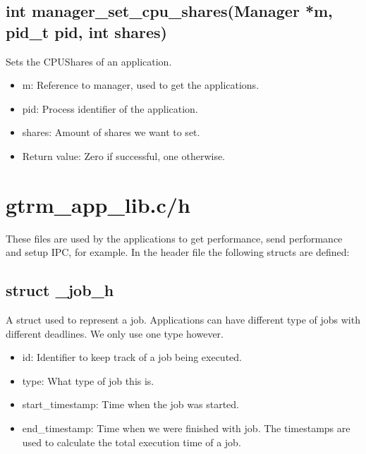 \documentclass[nobiblatex]{LTHthesis}
\begin{document}
\subsection{int manager\_set\_cpu\_shares(Manager *m, pid\_t pid, int shares)}
Sets the CPUShares of an application.
\begin{itemize}
\item m: Reference to manager, used to get the applications.
\item pid: Process identifier of the application.
\item shares: Amount of shares we want to set.
\item Return value: Zero if successful, one otherwise.
\end{itemize}

\section{gtrm\_app\_lib.c/h}
These files are used by the applications to get performance, send performance and setup IPC, for example.
In the header file the following structs are defined:
\subsection{struct \_job\_h}
A struct used to represent a job. Applications can have different type of jobs with different deadlines. We only use one type however.
\begin{itemize}
\item id: Identifier to keep track of a job being executed.
\item type: What type of job this is.
\item start\_timestamp: Time when the job was started.
\item end\_timestamp: Time when we were finished with job. The timestamps are used to calculate the total execution time of a job.
\end{itemize}
\end{document}
